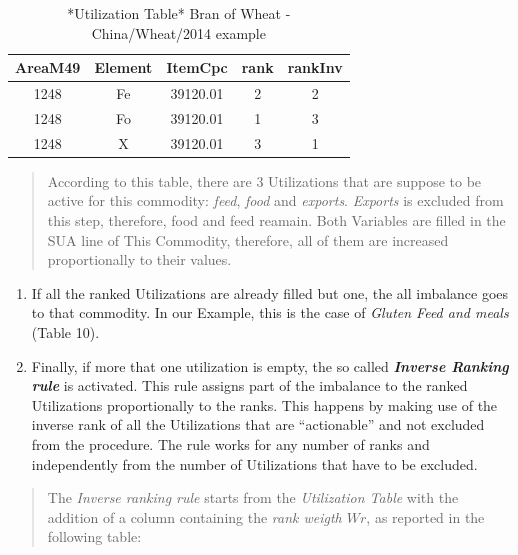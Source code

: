 \documentclass[]{article}
\begin{document}
\begin{table}

\caption{\label{tab:t9}*Utilization Table* Bran of Wheat - China/Wheat/2014 example}
\centering
\begin{tabular}[t]{c|c|c|c|c}
\hline
AreaM49 & Element & ItemCpc & rank & rankInv\\
\hline
1248 & Fe & 39120.01 & 2 & 2\\
\hline
1248 & Fo & 39120.01 & 1 & 3\\
\hline
1248 & X & 39120.01 & 3 & 1\\
\hline
\end{tabular}
\end{table}

\begin{quote}
According to this table, there are 3 Utilizations that are suppose to be
active for this commodity: \emph{feed}, \emph{food} and \emph{exports}.
\emph{Exports} is excluded from this step, therefore, food and feed
reamain. Both Variables are filled in the SUA line of This Commodity,
therefore, all of them are increased proportionally to their values.
\end{quote}

\begin{enumerate}
\def\labelenumi{\arabic{enumi}.}
\setcounter{enumi}{1}
\item
  If all the ranked Utilizations are already filled but one, the all
  imbalance goes to that commodity. In our Example, this is the case of
  \emph{Gluten Feed and meals} (Table 10).
\item
  Finally, if more that one utilization is empty, the so called
  \textbf{\emph{Inverse Ranking rule}} is activated. This rule assigns
  part of the imbalance to the ranked Utilizations proportionally to the
  ranks. This happens by making use of the inverse rank of all the
  Utilizations that are ``actionable'' and not excluded from the
  procedure. The rule works for any number of ranks and independently
  from the number of Utilizations that have to be excluded.
\end{enumerate}

\begin{quote}
The \emph{Inverse ranking rule} starts from the \emph{Utilization Table}
with the addition of a column containing the \emph{rank weigth \(Wr\)},
as reported in the following table:
\end{quote}
\end{document}

